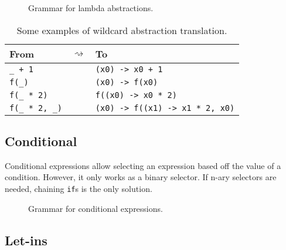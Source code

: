 \begin{figure}[H]
  \centering


  \caption{Grammar for lambda abstractions.}
  \label{fig:zilch-gramma-expressions-lambda-grammar}
\end{figure}

\begin{table}[htb]
  \begin{tabularx}{\textwidth}{YcY}
    \toprule
    From &  & To \\
    \midrule
    \verb|_ + 1| && \verb|(x0) -> x0 + 1| \\
    \verb|f(_)| && \verb|(x0) -> f(x0)| \\
    \verb|f(_ * 2)| && \verb|f((x0) -> x0 * 2)| \\
    \verb|f(_ * 2, _)| && \verb|(x0) -> f((x1) -> x1 * 2, x0)| \\
    \bottomrule
  \end{tabularx}

  \caption{Some examples of wildcard abstraction translation.}
  \label{table:zilch-grammar-expressions-lambda-translatewildcard}
\end{table}

\subsection{Conditional}\label{subsec:zilch-grammar-expressions-conditional}

Conditional expressions allow selecting an expression based off the value of a condition.
However, it only works as a binary selector.
If n-ary selectors are needed, chaining \texttt{if}s is the only solution.

\begin{figure}[H]
  \centering


  \caption{Grammar for conditional expressions.}
  \label{fig:zilch-gramma-expressions-conditional-grammar}
\end{figure}

\subsection{Let-ins}\label{subsec:zilch-grammar-expressions-letin}

